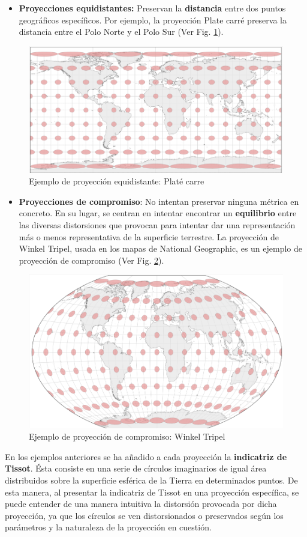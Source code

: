 \documentclass[
]{book}
\providecommand{\tightlist}{%
  \setlength{\itemsep}{0pt}\setlength{\parskip}{0pt}}
\theoremstyle{definition}
\theoremstyle{definition}
\theoremstyle{definition}
\theoremstyle{definition}
\theoremstyle{remark}
\begin{document}
\begin{itemize}
\tightlist
\item
  \textbf{Proyecciones equidistantes:} Preservan la \textbf{distancia} entre dos puntos
  geográficos específicos. Por ejemplo, la proyección Plate carré preserva la
  distancia entre el Polo Norte y el Polo Sur (Ver Fig. \ref{fig:equidist}).
\end{itemize}

\begin{figure}

{\centering \includegraphics[width=0.3\linewidth]{img/equidist} 

}

\caption{Ejemplo de proyección equidistante: Platé carre}\label{fig:equidist}
\end{figure}

\begin{itemize}
\tightlist
\item
  \textbf{Proyecciones de compromiso}: No intentan preservar ninguna métrica en
  concreto. En su lugar, se centran en intentar encontrar un \textbf{equilibrio}
  entre las diversas distorsiones que provocan para intentar dar una
  representación más o menos representativa de la superficie terrestre. La
  proyección de Winkel Tripel, usada en los mapas de National Geographic, es
  un ejemplo de proyección de compromiso (Ver Fig. \ref{fig:comp}).
\end{itemize}

\begin{figure}

{\centering \includegraphics[width=0.3\linewidth]{img/comp} 

}

\caption{Ejemplo de proyección de compromiso: Winkel Tripel}\label{fig:comp}
\end{figure}

En los ejemplos anteriores se ha añadido a cada proyección la \textbf{indicatriz de
Tissot}. Ésta consiste en una serie de círculos imaginarios de igual área
distribuidos sobre la superficie esférica de la Tierra en determinados puntos.
De esta manera, al presentar la indicatriz de Tissot en una proyección
específica, se puede entender de una manera intuitiva la distorsión provocada
por dicha proyección, ya que los círculos se ven distorsionados o preservados
según los parámetros y la naturaleza de la proyección en cuestión.

  
\end{document}
